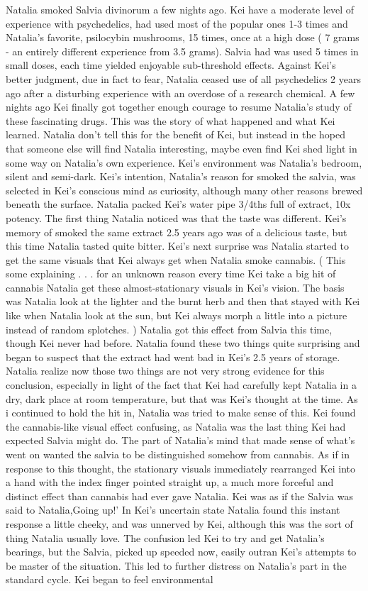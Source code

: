 \documentclass[12pt]{book}
\begin{document}
Natalia smoked Salvia divinorum a few nights ago. Kei have a moderate level of experience with psychedelics, had used most of the popular ones 1-3 times and Natalia's favorite, psilocybin mushrooms, 15 times, once at a high dose ( 7 grams - an entirely different experience from 3.5 grams). Salvia had was used 5 times in small doses, each time yielded enjoyable sub-threshold effects. Against Kei's better judgment, due in fact to fear, Natalia ceased use of all psychedelics 2 years ago after a disturbing experience with an overdose of a research chemical. A few nights ago Kei finally got together enough courage to resume Natalia's study of these fascinating drugs. This was the story of what happened and what Kei learned. Natalia don't tell this for the benefit of Kei, but instead in the hoped that someone else will find Natalia interesting, maybe even find Kei shed light in some way on Natalia's own experience. Kei's environment was Natalia's bedroom, silent and semi-dark. Kei's intention, Natalia's reason for smoked the salvia, was selected in Kei's conscious mind as curiosity, although many other reasons brewed beneath the surface. Natalia packed Kei's water pipe 3/4ths full of extract, 10x potency. The first thing Natalia noticed was that the taste was different. Kei's memory of smoked the same extract 2.5 years ago was of a delicious taste, but this time Natalia tasted quite bitter. Kei's next surprise was Natalia started to get the same visuals that Kei always get when Natalia smoke cannabis. ( This  some explaining . . .  for an unknown reason every time Kei take a big hit of cannabis Natalia get these almost-stationary visuals in Kei's vision. The basis was Natalia look at the lighter and the burnt herb and then that stayed with Kei like when Natalia look at the sun, but Kei always morph a little into a picture instead of random splotches. ) Natalia got this effect from Salvia this time, though Kei never had before. Natalia found these two things quite surprising and began to suspect that the extract had went bad in Kei's 2.5 years of storage. Natalia realize now those two things are not very strong evidence for this conclusion, especially in light of the fact that Kei had carefully kept Natalia in a dry, dark place at room temperature, but that was Kei's thought at the time. As i continued to hold the hit in, Natalia was tried to make sense of this. Kei found the cannabis-like visual effect confusing, as Natalia was the last thing Kei had expected Salvia might do. The part of Natalia's mind that made sense of what's went on wanted the salvia to be distinguished somehow from cannabis. As if in response to this thought, the stationary visuals immediately rearranged Kei into a hand with the index finger pointed straight up, a much more forceful and distinct effect than cannabis had ever gave Natalia. Kei was as if the Salvia was said to Natalia,Going up!' In Kei's uncertain state Natalia found this instant response a little cheeky, and was unnerved by Kei, although this was the sort of thing Natalia usually love. The confusion led Kei to try and get Natalia's bearings, but the Salvia, picked up speeded now, easily outran Kei's attempts to be master of the situation. This led to further distress on Natalia's part in the standard cycle. Kei began to feel environmental 
\end{document}
